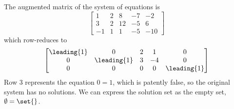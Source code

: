The augmented matrix of the system of equations is
%
\begin{equation*}
\begin{bmatrix}
1 & 2 & 8 & -7 & -2\\ 
3 & 2 & 12 & -5 & 6\\ 
-1 & 1 & 1 & -5 & -10
\end{bmatrix}
\end{equation*}
%
which row-reduces to
%
\begin{equation*}
\begin{bmatrix}
\leading{1} & 0 & 2 & 1 & 0\\ 
0 & \leading{1} & 3 & -4 & 0\\ 
0 & 0 & 0 & 0 & \leading{1}
\end{bmatrix}
\end{equation*}
%
Row 3 represents the equation $0=1$, which is patently false, so the original system has no solutions.  We can express the solution set as the empty set, $\emptyset=\set{\relax}$.

